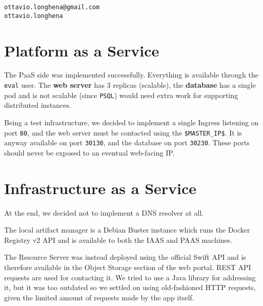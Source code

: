\documentclass[a4paper,11pt,hidelinks,twocolumn]{article}
\begin{document}
\begin{verbatim}
ottavio.longhena@gmail.com
ottavio.longhena
\end{verbatim}

\section{Platform as a Service}

The PaaS side was implemented successfully. Everything is available through the \texttt{eval} user. The \textbf{web server} has 3 replicas (scalable), the \textbf{database} has a single pod and is not scalable (since \texttt{PSQL}) would need extra work for supporting distributed instances.

Being a test infrastructure, we decided to implement a single Ingress listening on port \verb=80=, and the web server must be contacted using the \verb=$MASTER_IP$=. It is anyway available on port \verb=30130=, and the database on port \verb=30230=. These ports should never be exposed to an eventual web-facing IP.

\section{Infrastructure as a Service}

At the end, we decided not to implement a DNS resolver at all. 

The local artifact manager is a Debian Buster instance which runs the Docker Registry v2 API and is available to both the IAAS and PAAS machines.

The Resource Server was instead deployed using the official Swift API and is therefore available in the Object Storage section of the web portal. REST API requests are used for contacting it. We tried to use a Java library for addressing it, but it was too outdated so we settled on using old-fashioned HTTP requests, given the limited amount of requests made by the app itself.

\endgroup
\end{document}
